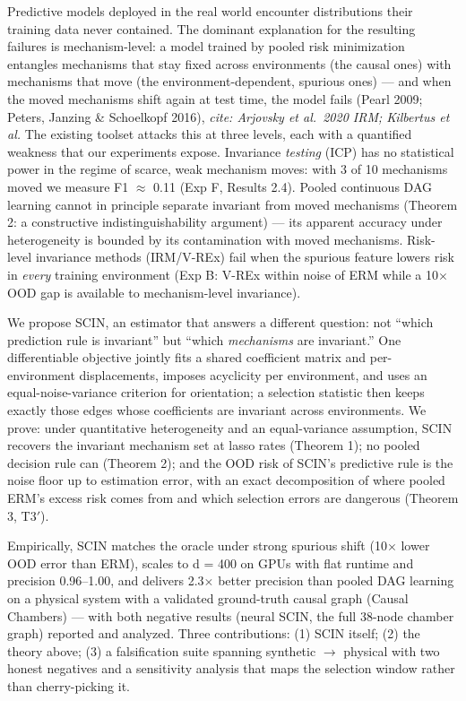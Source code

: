 \documentclass[11pt]{article}
\begin{document}
Predictive models deployed in the real world encounter distributions
their training data never contained. The dominant explanation for the
resulting failures is mechanism-level: a model trained by pooled risk
minimization entangles mechanisms that stay fixed across environments
(the causal ones) with mechanisms that move (the environment-dependent,
spurious ones) --- and when the moved mechanisms shift again at test
time, the model fails (Pearl 2009; Peters, Janzing \& Schoelkopf 2016),
\emph{cite: Arjovsky et al.~2020 IRM; Kilbertus et al.} The existing toolset
attacks this at three levels, each with a quantified weakness that our
experiments expose. Invariance \emph{testing} (ICP) has no statistical power
in the regime of scarce, weak mechanism moves: with 3 of 10 mechanisms
moved we measure F1 \(\approx\) 0.11 (Exp F, Results 2.4). Pooled continuous DAG
learning cannot in principle separate invariant from moved mechanisms
(Theorem 2: a constructive indistinguishability argument) --- its
apparent accuracy under heterogeneity is bounded by its contamination
with moved mechanisms. Risk-level invariance methods (IRM/V-REx) fail
when the spurious feature lowers risk in \emph{every} training environment
(Exp B: V-REx within noise of ERM while a 10\(\times\) OOD gap is available to
mechanism-level invariance).

We propose SCIN, an estimator that answers a different question: not
``which prediction rule is invariant'' but ``which \emph{mechanisms} are
invariant.'' One differentiable objective jointly fits a shared
coefficient matrix and per-environment displacements, imposes
acyclicity per environment, and uses an equal-noise-variance criterion
for orientation; a selection statistic then keeps exactly those edges
whose coefficients are invariant across environments. We prove: under
quantitative heterogeneity and an equal-variance assumption, SCIN
recovers the invariant mechanism set at lasso rates (Theorem 1); no
pooled decision rule can (Theorem 2); and the OOD risk of SCIN's
predictive rule is the noise floor up to estimation error, with an
exact decomposition of where pooled ERM's excess risk comes from and
which selection errors are dangerous (Theorem 3, T3\('\)).

Empirically, SCIN matches the oracle under strong spurious shift (10\(\times\)
lower OOD error than ERM), scales to d = 400 on GPUs with flat runtime
and precision 0.96--1.00, and delivers 2.3\(\times\) better precision than
pooled DAG learning on a physical system with a validated ground-truth
causal graph (Causal Chambers) --- with both negative results (neural
SCIN, the full 38-node chamber graph) reported and analyzed. Three
contributions: (1) SCIN itself; (2) the theory above; (3) a
falsification suite spanning synthetic \(\rightarrow\) physical with two honest
negatives and a sensitivity analysis that maps the selection window
rather than cherry-picking it.
\end{document}
